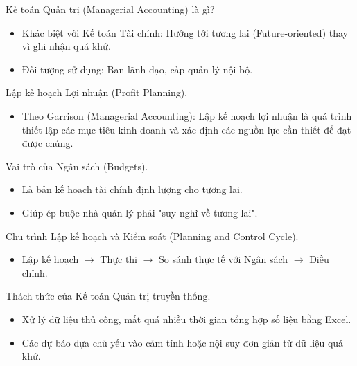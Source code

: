 \documentclass[aspectratio=169]{beamer}
\begin{document}
\begin{frame}{Kế toán Quản trị (Managerial Accounting) là gì?}
    \begin{itemize}
        \item Khác biệt với Kế toán Tài chính: Hướng tới tương lai (Future-oriented) thay vì ghi nhận quá khứ.
        \item Đối tượng sử dụng: Ban lãnh đạo, cấp quản lý nội bộ.
    \end{itemize}
\end{frame}


\begin{frame}{Lập kế hoạch Lợi nhuận (Profit Planning).}
    \begin{itemize}
        \item Theo Garrison (Managerial Accounting): Lập kế hoạch lợi nhuận là quá trình thiết lập các mục tiêu kinh doanh và xác định các nguồn lực cần thiết để đạt được chúng.
    \end{itemize}
\end{frame}


\begin{frame}{Vai trò của Ngân sách (Budgets).}
    \begin{itemize}
        \item Là bản kế hoạch tài chính định lượng cho tương lai.
        \item Giúp ép buộc nhà quản lý phải "suy nghĩ về tương lai".
    \end{itemize}
\end{frame}


\begin{frame}{Chu trình Lập kế hoạch và Kiểm soát (Planning and Control Cycle).}
    \begin{itemize}
        \item Lập kế hoạch $\rightarrow$ Thực thi $\rightarrow$ So sánh thực tế với Ngân sách $\rightarrow$ Điều chỉnh.
    \end{itemize}
\end{frame}


\begin{frame}{Thách thức của Kế toán Quản trị truyền thống.}
    \begin{itemize}
        \item Xử lý dữ liệu thủ công, mất quá nhiều thời gian tổng hợp số liệu bằng Excel.
        \item Các dự báo dựa chủ yếu vào cảm tính hoặc nội suy đơn giản từ dữ liệu quá khứ.
    \end{itemize}
\end{frame}
\end{document}
